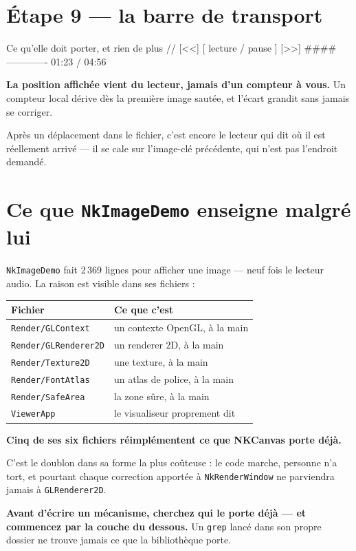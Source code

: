 \section{Étape 9 --- la barre de transport}

\begin{nkcode}{Ce qu'elle doit porter, et rien de plus}
// [<<]  [ lecture / pause ]  [>>]   ####-------------  01:23 / 04:56
\end{nkcode}

\begin{nkretenir}
\textbf{La position affichée vient du lecteur, jamais d'un compteur à vous.} Un
compteur local dérive dès la première image sautée, et l'écart grandit sans
jamais se corriger.

Après un déplacement dans le fichier, c'est encore le lecteur qui dit où il est
réellement arrivé --- il se cale sur l'image-clé précédente, qui n'est pas
l'endroit demandé.
\end{nkretenir}

\section{Ce que \texttt{NkImageDemo} enseigne malgré lui}

\texttt{NkImageDemo} fait 2\,369 lignes pour afficher une image --- neuf fois le
lecteur audio. La raison est visible dans ses fichiers :

\begin{center}
\begin{tabular}{@{}ll@{}}
\toprule
\textbf{Fichier} & \textbf{Ce que c'est} \\
\midrule
\texttt{Render/GLContext} & un contexte OpenGL, à la main \\
\texttt{Render/GLRenderer2D} & un renderer 2D, à la main \\
\texttt{Render/Texture2D} & une texture, à la main \\
\texttt{Render/FontAtlas} & un atlas de police, à la main \\
\texttt{Render/SafeArea} & la zone sûre, à la main \\
\texttt{ViewerApp} & le visualiseur proprement dit \\
\bottomrule
\end{tabular}
\end{center}

\begin{nkretenir}
\textbf{Cinq de ses six fichiers réimplémentent ce que NKCanvas porte déjà.}

C'est le doublon dans sa forme la plus coûteuse : le code marche, personne n'a
tort, et pourtant chaque correction apportée à \texttt{NkRenderWindow} ne
parviendra jamais à \texttt{GLRenderer2D}.

\textbf{Avant d'écrire un mécanisme, cherchez qui le porte déjà --- et commencez
par la couche du dessous.} Un \texttt{grep} lancé dans son propre dossier ne
trouve jamais ce que la bibliothèque porte.
\end{nkretenir}

